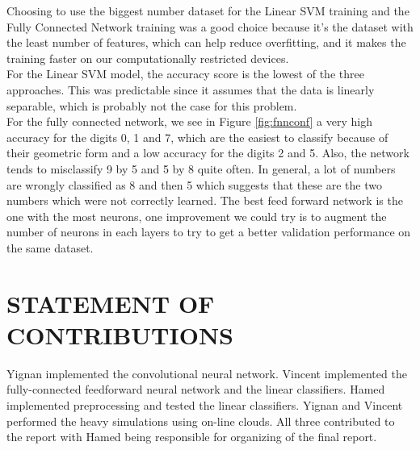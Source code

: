 \documentclass[letterpaper, 10 pt, conference]{ieeeconf}  %
\begin{document}
Choosing to use the biggest number dataset for the Linear SVM training and the Fully Connected Network training was a good choice because it's the dataset with the least number of features, which can help reduce overfitting, and it makes the training faster on our computationally restricted devices. \\
For the Linear SVM model, the accuracy score is the lowest of the three approaches. This was predictable since it assumes that the data is linearly separable, which is probably not the case for this problem.\\
For the fully connected network, we see in Figure \ref{fig:fnnconf} a very high accuracy for the digits 0, 1 and 7, which are the easiest to classify because of their geometric form and a low accuracy for the digits 2 and 5. Also, the network tends to misclassify 9 by 5 and 5 by 8 quite often. In general, a lot of numbers are wrongly classified as 8 and then 5 which suggests that these are the two numbers which were not correctly learned.
The best feed forward network is the one with the most neurons, one improvement we could try is to augment the number of neurons in each layers to try to get a better validation performance on the same dataset. \\



\addtolength{\textheight}{-12cm}   %






\section*{STATEMENT OF CONTRIBUTIONS}
Yignan implemented the convolutional neural network.
Vincent implemented the fully-connected feedforward neural
network and the linear classifiers. Hamed implemented preprocessing and tested the linear classifiers. Yignan and Vincent performed the heavy simulations using on-line clouds. All three contributed to the report with Hamed being responsible for organizing of the final report.
\end{document}
